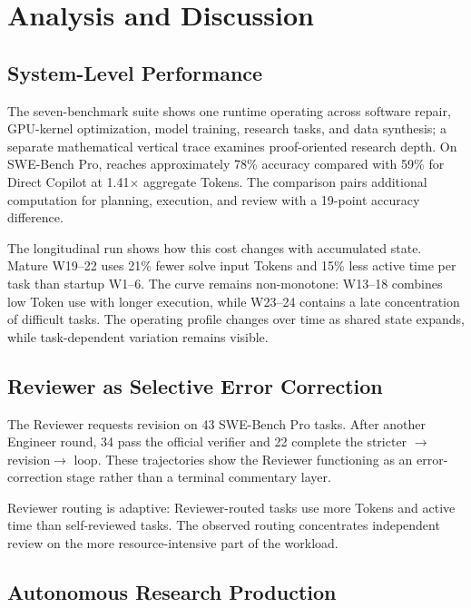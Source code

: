 \section{Analysis and Discussion}
\label{sec:discussion}

\subsection{System-Level Performance}

The seven-benchmark suite shows one runtime operating across software repair,
GPU-kernel optimization, model training, research tasks, and data synthesis; a
separate mathematical vertical trace examines proof-oriented research depth. On
SWE-Bench Pro, \systemname reaches approximately 78\%
accuracy compared with 59\% for Direct Copilot at 1.41$\times$ aggregate Tokens.
The comparison pairs additional computation for planning, execution, and review
with a 19-point accuracy difference.

The longitudinal run shows how this cost changes with accumulated state. Mature
W19--22 uses 21\% fewer solve input Tokens and 15\% less active time per task than
startup W1--6. The curve remains non-monotone: W13--18 combines low Token use with
longer execution, while W23--24 contains a late concentration of difficult tasks. The operating profile changes
over time as shared state expands, while task-dependent variation remains visible.

\subsection{Reviewer as Selective Error Correction}

The Reviewer requests revision on 43 SWE-Bench Pro tasks. After another Engineer
round, 34 pass the official verifier and 22 complete the stricter
$\rightarrow$revision$\rightarrow$ loop. These trajectories
show the Reviewer functioning as an error-correction stage rather than a terminal
commentary layer.

Reviewer routing is adaptive: Reviewer-routed tasks use more Tokens and active time
than self-reviewed tasks. The observed routing concentrates independent review on
the more resource-intensive part of the workload.

\subsection{Autonomous Research Production}

